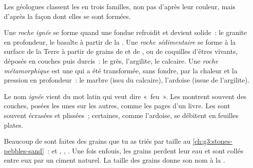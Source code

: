Les géologues classent les  en trois familles, non pas d'après leur
couleur, mais d'après la façon dont elles se sont formées.

\begin{definition}\label{def:g6:rocks-and-minerals:rock-families}
Une \emph{roche ignée} se forme quand une
 fondue refroidit et devient solide~: le granite en profondeur, le
basalte à partir de la .
Une \emph{roche sédimentaire}
se forme à la surface de la Terre à partir de grains de  et de ,
ou de coquilles d'êtres vivants, déposés en couches puis durcis~: le grès,
l'argilite, le calcaire.
Une \emph{roche métamorphique}
est une  qui a été transformée, sans fondre, par la chaleur et la
pression en profondeur~: le marbre (issu du calcaire), l'ardoise (issue de
l'argilite).
\end{definition}

Le nom \emph{ignée} vient du mot latin qui veut dire «~feu~». Les  montrent souvent des couches, posées les unes sur les
autres, comme les pages d'un livre. Les  sont souvent
écrasées et plissées~; certaines, comme l'ardoise, se débitent en feuilles
plates.

Beaucoup de  sont faites des grains que tu as triés par
taille au \cref{ch:g3:stones-pebbles-sand}~:  et , ,
. Une fois enfouis, les grains perdent leur eau et sont collés entre
eux par un ciment naturel. La taille des grains donne son nom à la .

